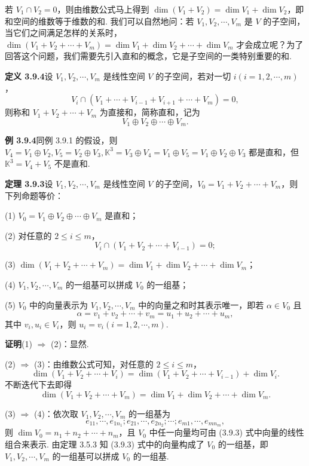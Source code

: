 \documentclass[UTF8, 12pt, fontset=fandol, oneside]{ctexart}
\begin{document}
若 $V_1\cap V_2=0$，则由维数公式马上得到 $\dim(V_1+V_2)=\dim V_1+\dim V_2$，即和空间的维数等于维数的和. 我们可以自然地问：若 $V_1,V_2,\cdots,V_m$ 是 $V$ 的子空间，当它们之间满足怎样的关系时，$\dim(V_1+V_2+\cdots+V_m)=\dim V_1+\dim V_2+\cdots+\dim V_m$ 才会成立呢？为了回答这个问题，我们需要先引入直和的概念，它是子空间的一类特别重要的和.

\noindent\textbf{定义 3.9.4}\quad 设 $V_1,V_2,\cdots,V_m$ 是线性空间 $V$ 的子空间，若对一切 $i(i=1,2,\cdots,m)$，
\[
V_i\cap(V_1+\cdots+V_{i-1}+V_{i+1}+\cdots+V_m)=0,
\]
则称和 $V_1+V_2+\cdots+V_m$ 为直接和，简称直和，记为
\[
V_1\oplus V_2\oplus\cdots\oplus V_m.
\]

\noindent\textbf{例 3.9.4}\quad 同例 3.9.1 的假设，则 $V_4=V_1\oplus V_2,V_5=V_2\oplus V_3,\mathbb{K}^3=V_3\oplus V_4=V_1\oplus V_5=V_1\oplus V_2\oplus V_3$ 都是直和，但 $\mathbb{K}^3=V_4+V_5$ 不是直和.

\noindent\textbf{定理 3.9.3}\quad 设 $V_1,V_2,\cdots,V_m$ 是线性空间 $V$ 的子空间，$V_0=V_1+V_2+\cdots+V_m$，则下列命题等价：

(1) $V_0=V_1\oplus V_2\oplus\cdots\oplus V_m$ 是直和；

(2) 对任意的 $2\leq i\leq m$，
\[
V_i\cap(V_1+V_2+\cdots+V_{i-1})=0;
\]

(3) $\dim(V_1+V_2+\cdots+V_m)=\dim V_1+\dim V_2+\cdots+\dim V_m$；

(4) $V_1,V_2,\cdots,V_m$ 的一组基可以拼成 $V_0$ 的一组基；

(5) $V_0$ 中的向量表示为 $V_1,V_2,\cdots,V_m$ 中的向量之和时其表示唯一，即若 $\alpha\in V_0$ 且
\[
\alpha=v_1+v_2+\cdots+v_m=u_1+u_2+\cdots+u_m,
\]
其中 $v_i,u_i\in V_i$，则 $u_i=v_i(i=1,2,\cdots,m)$.

\noindent\textbf{证明}\quad (1) $\Rightarrow$ (2)：显然.

(2) $\Rightarrow$ (3)：由维数公式可知，对任意的 $2\leq i\leq m$，
\[
\dim(V_1+V_2+\cdots+V_i)=\dim(V_1+V_2+\cdots+V_{i-1})+\dim V_i.
\]
不断迭代下去即得
\[
\dim(V_1+V_2+\cdots+V_m)=\dim V_1+\dim V_2+\cdots+\dim V_m.
\]

(3) $\Rightarrow$ (4)：依次取 $V_1,V_2,\cdots,V_m$ 的一组基为
\begin{equation}
e_{11},\cdots,e_{1n_1};e_{21},\cdots,e_{2n_2};\cdots;e_{m1},\cdots,e_{mn_m},
\tag{3.9.3}
\end{equation}
则 $\dim V_0=n_1+n_2+\cdots+n_m$，且 $V_0$ 中任一向量均可由 (3.9.3) 式中向量的线性组合来表示. 由定理 3.5.3 知 (3.9.3) 式中的向量构成了 $V_0$ 的一组基，即 $V_1,V_2,\cdots,V_m$ 的一组基可以拼成 $V_0$ 的一组基.
\end{document}
